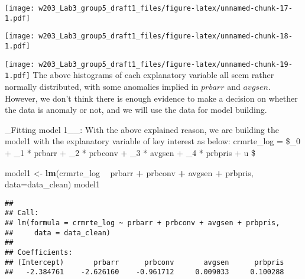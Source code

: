 \documentclass[]{article}
\newenvironment{Shaded}{\begin{snugshade}}{\end{snugshade}}
\newcommand{\KeywordTok}[1]{\textcolor[rgb]{0.13,0.29,0.53}{\textbf{#1}}}
\newcommand{\DataTypeTok}[1]{\textcolor[rgb]{0.13,0.29,0.53}{#1}}
\newcommand{\DecValTok}[1]{\textcolor[rgb]{0.00,0.00,0.81}{#1}}
\newcommand{\StringTok}[1]{\textcolor[rgb]{0.31,0.60,0.02}{#1}}
\newcommand{\CommentTok}[1]{\textcolor[rgb]{0.56,0.35,0.01}{\textit{#1}}}
\newcommand{\OperatorTok}[1]{\textcolor[rgb]{0.81,0.36,0.00}{\textbf{#1}}}
\newcommand{\NormalTok}[1]{#1}
\begin{document}
\begin{Shaded}
\end{Shaded}

\texttt{[image: w203\_Lab3\_group5\_draft1\_files/figure-latex/unnamed-chunk-17-1.pdf]}

\begin{Shaded}
\end{Shaded}

\texttt{[image: w203\_Lab3\_group5\_draft1\_files/figure-latex/unnamed-chunk-18-1.pdf]}

\begin{Shaded}
\end{Shaded}

\texttt{[image: w203\_Lab3\_group5\_draft1\_files/figure-latex/unnamed-chunk-19-1.pdf]}
The above histograms of each explanatory variable all seem rather
normally distributed, with some anomalies implied in \(prbarr\) and
\(avgsen\). However, we don't think there is enough evidence to make a
decision on whether the data is anomaly or not, and we will use the data
for model building.

\_Fitting model 1\_\_: With the above explained reason, we are building
the model1 with the explanatory variable of key interest as below:
crmrte\_log = \$\beta\_0 + \beta\_1 * prbarr + \beta\_2 * prbconv +
\beta\_3 * avgsen + \beta\_4 * prbpris + u \$

\begin{Shaded}
\begin{Highlighting}[]
\NormalTok{model1 <-}\StringTok{ }\KeywordTok{lm}\NormalTok{(crmrte_log }\OperatorTok{~}\StringTok{ }\NormalTok{prbarr }\OperatorTok{+}\StringTok{ }\NormalTok{prbconv }\OperatorTok{+}\StringTok{ }\NormalTok{avgsen }\OperatorTok{+}\StringTok{ }\NormalTok{prbpris, }\DataTypeTok{data=}\NormalTok{data_clean)}
\NormalTok{model1}
\end{Highlighting}
\end{Shaded}

\begin{verbatim}
## 
## Call:
## lm(formula = crmrte_log ~ prbarr + prbconv + avgsen + prbpris, 
##     data = data_clean)
## 
## Coefficients:
## (Intercept)       prbarr      prbconv       avgsen      prbpris  
##   -2.384761    -2.626160    -0.961712     0.009033     0.100288
\end{verbatim}
\end{document}

